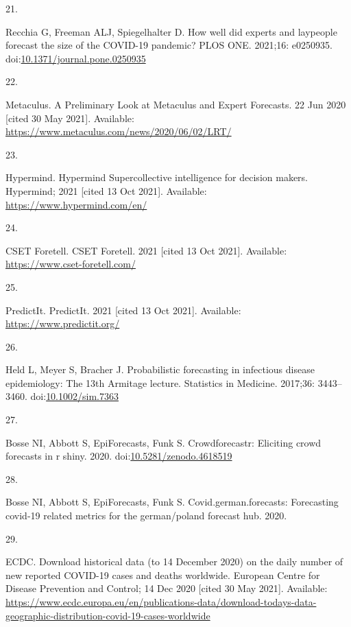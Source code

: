 \documentclass[10pt,letterpaper]{article}
\newlength{\cslhangindent}
\newlength{\csllabelwidth}
\newlength{\cslentryspacingunit} %
\newenvironment{CSLReferences}[2] %
 {%
  \setlength{\parindent}{0pt}
  \ifodd #1
  \let\oldpar\par
  \def\par{\hangindent=\cslhangindent\oldpar}
  \fi
  \setlength{\parskip}{#2\cslentryspacingunit}
 }%
 {}
\newcommand{\CSLLeftMargin}[1]{\parbox[t]{\csllabelwidth}{#1}}
\newcommand{\CSLRightInline}[1]{\parbox[t]{\linewidth - \csllabelwidth}{#1}\break}
\begin{document}
\begin{CSLReferences}{0}{0}
\leavevmode{}%
\CSLLeftMargin{21. }%
\CSLRightInline{Recchia G, Freeman ALJ, Spiegelhalter D. How well did
experts and laypeople forecast the size of the {COVID-19} pandemic? PLOS
ONE. 2021;16: e0250935.
doi:\href{https://doi.org/10.1371/journal.pone.0250935}{10.1371/journal.pone.0250935}}

\leavevmode{}%
\CSLLeftMargin{22. }%
\CSLRightInline{Metaculus. A {Preliminary Look} at {Metaculus} and
{Expert Forecasts}. 22 Jun 2020 {[}cited 30 May 2021{]}. Available:
\url{https://www.metaculus.com/news/2020/06/02/LRT/}}

\leavevmode{}%
\CSLLeftMargin{23. }%
\CSLRightInline{Hypermind. Hypermind \textbar{} {Supercollective}
intelligence for decision makers. {Hypermind}; 2021 {[}cited 13 Oct
2021{]}. Available: \url{https://www.hypermind.com/en/}}

\leavevmode{}%
\CSLLeftMargin{24. }%
\CSLRightInline{CSET Foretell. {CSET Foretell}. 2021 {[}cited 13 Oct
2021{]}. Available: \url{https://www.cset-foretell.com/}}

\leavevmode{}%
\CSLLeftMargin{25. }%
\CSLRightInline{PredictIt. {PredictIt}. 2021 {[}cited 13 Oct 2021{]}.
Available: \url{https://www.predictit.org/}}

\leavevmode{}%
\CSLLeftMargin{26. }%
\CSLRightInline{Held L, Meyer S, Bracher J. Probabilistic forecasting in
infectious disease epidemiology: The 13th {Armitage} lecture. Statistics
in Medicine. 2017;36: 3443--3460.
doi:\href{https://doi.org/10.1002/sim.7363}{10.1002/sim.7363}}

\leavevmode{}%
\CSLLeftMargin{27. }%
\CSLRightInline{Bosse NI, Abbott S, EpiForecasts, Funk S.
Crowdforecastr: Eliciting crowd forecasts in r shiny. 2020.
doi:\href{https://doi.org/10.5281/zenodo.4618519}{10.5281/zenodo.4618519}}

\leavevmode{}%
\CSLLeftMargin{28. }%
\CSLRightInline{Bosse NI, Abbott S, EpiForecasts, Funk S.
Covid.german.forecasts: Forecasting covid-19 related metrics for the
german/poland forecast hub. 2020. }

\leavevmode{}%
\CSLLeftMargin{29. }%
\CSLRightInline{ECDC. Download historical data (to 14 {December} 2020)
on the daily number of new reported {COVID-19} cases and deaths
worldwide. {European Centre for Disease Prevention and Control}; 14 Dec
2020 {[}cited 30 May 2021{]}. Available:
\url{https://www.ecdc.europa.eu/en/publications-data/download-todays-data-geographic-distribution-covid-19-cases-worldwide}}


\end{CSLReferences}
\end{document}
